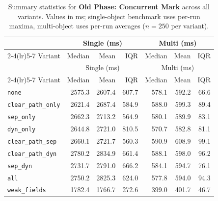 \begin{longtable}{l rrr rrr}
\caption[Old Phase: Concurrent Mark summary statistics]{Summary statistics for \textbf{Old Phase: Concurrent Mark} across all variants. Values in ms; single-object benchmark uses per-run maxima, multi-object uses per-run averages ($n=250$ per variant).}\label{tab:stats-old-concurrent-mark} \\
\toprule
 & \multicolumn{3}{c}{Single (ms)} & \multicolumn{3}{c}{Multi (ms)} \\
\cmidrule(lr){2-4}\cmidrule(lr){5-7}
Variant & Median & Mean & IQR & Median & Mean & IQR \\
\midrule
\endfirsthead
\toprule
 & \multicolumn{3}{c}{Single (ms)} & \multicolumn{3}{c}{Multi (ms)} \\
\cmidrule(lr){2-4}\cmidrule(lr){5-7}
Variant & Median & Mean & IQR & Median & Mean & IQR \\
\midrule
\endhead
\bottomrule
\endfoot
\texttt{none} & 2575.3 & 2607.4 & 607.7 & 578.1 & 592.2 & 66.6 \\
\texttt{clear\_path\_only} & 2621.4 & 2687.4 & 584.9 & 588.0 & 599.3 & 89.4 \\
\texttt{sep\_only} & 2662.3 & 2713.2 & 564.9 & 580.1 & 589.9 & 83.1 \\
\texttt{dyn\_only} & 2644.8 & 2721.0 & 810.5 & 570.7 & 582.8 & 81.1 \\
\texttt{clear\_path\_sep} & 2660.1 & 2721.7 & 560.3 & 590.9 & 608.9 & 99.1 \\
\texttt{clear\_path\_dyn} & 2780.2 & 2834.9 & 661.4 & 588.1 & 598.0 & 96.2 \\
\texttt{sep\_dyn} & 2731.7 & 2791.0 & 666.2 & 584.1 & 594.7 & 76.1 \\
\texttt{all} & 2750.2 & 2825.3 & 624.0 & 577.8 & 594.0 & 94.3 \\
\texttt{weak\_fields} & 1782.4 & 1766.7 & 272.6 & 399.0 & 401.7 & 46.7 \\
\end{longtable}
